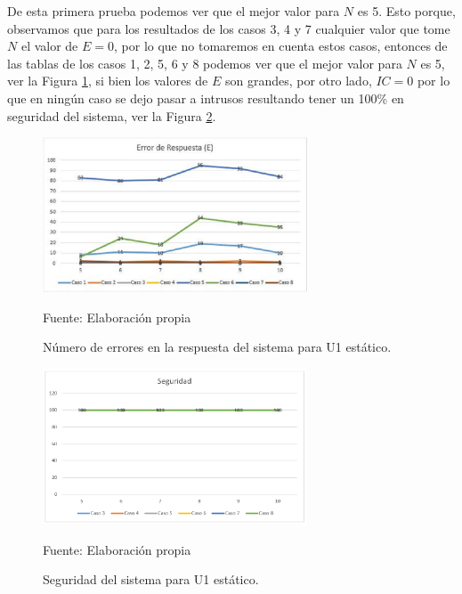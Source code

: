 De esta primera prueba podemos ver que el mejor valor para $N$ es 5. Esto porque, observamos que para los resultados de los casos 3, 4 y 7 cualquier valor que tome $N$ el valor de $E = 0$, por lo que no tomaremos en cuenta estos casos, entonces de las tablas de los casos 1, 2, 5, 6 y 8 podemos ver que el mejor valor para $N$ es 5, ver la Figura \ref{fig:figura4.9}, si bien los valores de $E$ son grandes, por otro lado, $IC = 0$ por lo que en ningún caso se dejo pasar a intrusos resultando tener un 100\% en seguridad del sistema, ver la Figura \ref{fig:figura4.10}.

\begin{figure}[H]
\begin{center}
\includegraphics[width=0.7\textwidth]{Imagenes/Cap4/image009}
\end{center}
\begin{center}
\vskip -0.5cm
\caption{\small{Número de errores en la respuesta del sistema para U1 estático.}}
\label{fig:figura4.9}
{\small{Fuente: Elaboración propia}}
\end{center}
\end{figure}

\begin{figure}[H]
\begin{center}
\includegraphics[width=0.7\textwidth]{Imagenes/Cap4/image010}
\end{center}
\begin{center}
\vskip -0.5cm
\caption{\small{Seguridad del sistema para U1 estático.}}
\label{fig:figura4.10}
{\small{Fuente: Elaboración propia}}
\end{center}
\end{figure}

